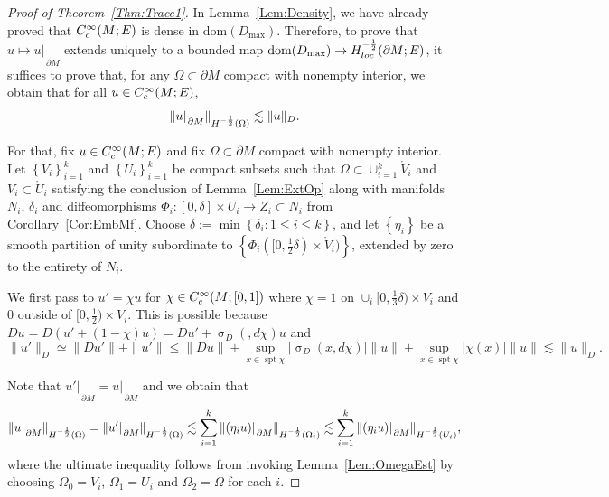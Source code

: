 \documentclass[a4paper,10pt,reqno]{amsart}
\newcommand{\sym}{\upsigma}
\newcommand{\rest}[1]{{{\lvert_{}}_{}}_{#1}}
\newcommand{\dbrac}[1]{\left\{#1\right\}}
\newcommand{\interior}[1]{\mathring{#1}}
\newcommand{\modulus}[1]{|#1|}
\newcommand{\norm}[1]{\| #1 \|}%
\newcommand{\set}[1]{\dbrac{#1}}
\newcommand{\Ck}[2][{}]{{\rm C}^{#2}_{\rm #1}}%
\newcommand{\Hard}[2][{}]{{\rm H}^{#2}_{\rm #1}}%
\newcommand{\SobH}[2][{}]{\Hard[#1]{\rm #2}}
\newcommand{\dom}{\mathrm{dom}}
\newcommand{\union}{\cup}
\DeclareMathOperator{\spt}{spt}%
\theoremstyle{definition}
\begin{document}
\begin{proof}[Proof of Theorem~\ref{Thm:Trace1}]
In Lemma~\ref{Lem:Density}, we have already proved that $\Ck[c]{\infty}(M;E)$ is dense in $\dom(D_{\max})$.
Therefore, to prove that $u \mapsto u\rest{\partial M}$ extends uniquely to a bounded map $\dom(D_{\max}) \to \SobH[loc]{-\frac12}(\partial M;E)$, it suffices to prove that, for any $\Omega \subset \partial M$ compact with nonempty interior, we obtain that for all $u \in \Ck[c]{\infty}(M;E)$,
$$ \norm{u\rest{\partial M}}_{\SobH{-\frac12}(\Omega)} \lesssim \norm{u}_{D}.$$

For that, fix $u \in \Ck[c]{\infty}(M;E)$ and fix $\Omega \subset \partial M$ compact with nonempty interior.
Let $\set{V_i}_{i=1}^k$ and $\set{U_i}_{i=1}^k$ be compact subsets such that $\Omega \subset \union_{i=1}^k \interior{V}_i$ and $V_i \subset \interior{U}_i$ satisfying the conclusion of Lemma~\ref{Lem:ExtOp} along with manifolds $N_i$, $\delta_i$ and diffeomorphisms $\Phi_i:[0, \delta] \times U_i \to Z_i \subset N_i$ from Corollary~\ref{Cor:EmbMf}.
Choose $\delta := \min\set{\delta_i: 1 \leq i \leq k}$, and let $\set{\eta_i}$ be a smooth partition of unity subordinate to $\set{ \Phi_i ([0,\frac12 \delta) \times \interior{V}_i)}$, extended by zero to the entirety of $N_i$.

We first pass to $u' = \chi u$ for $\chi \in \Ck[c]{\infty}(M;[0,1])$ where $\chi = 1$ on $\union_i [0, \frac13 \delta) \times V_i$ and $0$ outside of $[0,\frac12) \times V_i$.
This is possible because $Du = D(u' + (1 - \chi)u) = Du' + \sym_{D}(\dot, d\chi)u$ and
\begin{equation}
\label{Eq:Trace1:1}
\norm{u'}_{D} \simeq \norm{Du'} + \norm{u'} \leq \norm{Du} + \sup_{x \in \spt \chi} \modulus{\sym_{D}(x,d\chi)} \norm{u} + \sup_{x \in \spt \chi} \modulus{\chi(x)} \norm{u} \lesssim \norm{u}_{D}.
\end{equation}

Note that $u'\rest{\partial M} = u\rest{\partial M}$ and  we obtain that
\begin{equation}
\label{Eq:Trace1:2}
\norm{u\rest{\partial M}}_{\SobH{-\frac12}(\Omega)} = \norm{u'\rest{\partial M}}_{\SobH{-\frac12}(\Omega)} \lesssim \sum_{i=1}^k \norm{(\eta_i u)\rest{\partial M}}_{\SobH{-\frac12}(\Omega_i)}
\lesssim
\sum_{i=1}^k \norm{(\eta_i u)\rest{\partial M}}_{\SobH{-\frac12}(U_i)},
\end{equation}
where the ultimate inequality follows from invoking Lemma~\ref{Lem:OmegaEst} by choosing $\Omega_0 = V_i$, $\Omega_1 = U_i$ and $\Omega_2 = \Omega$ for each $i$.


\end{proof}
\end{document}
